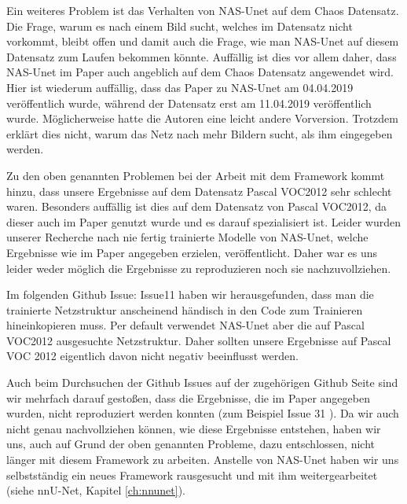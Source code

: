 Ein weiteres Problem ist das Verhalten von NAS-Unet auf dem Chaos Datensatz. Die Frage, warum es nach einem Bild sucht, welches im Datensatz nicht vorkommt, bleibt offen und damit auch die Frage, wie man NAS-Unet auf diesem Datensatz zum Laufen bekommen könnte. Auffällig ist dies vor allem daher, dass NAS-Unet im Paper auch angeblich auf dem Chaos Datensatz angewendet wird. Hier ist wiederum auffällig, dass das Paper zu NAS-Unet am 04.04.2019 veröffentlich wurde, während der Datensatz erst am 11.04.2019 veröffentlich wurde. Möglicherweise hatte die Autoren eine leicht andere Vorversion. Trotzdem erklärt dies nicht, warum das Netz nach mehr Bildern sucht, als ihm eingegeben werden.

Zu den oben genannten Problemen bei der Arbeit mit dem Framework kommt hinzu, dass unsere Ergebnisse auf dem Datensatz Pascal VOC2012 sehr schlecht waren. Besonders auffällig ist dies auf dem Datensatz von Pascal VOC2012, da dieser auch im Paper genutzt wurde und es darauf spezialisiert ist. Leider wurden unserer Recherche nach nie fertig trainierte Modelle von NAS-Unet, welche Ergebnisse wie im Paper angegeben erzielen, veröffentlicht. Daher war es uns leider weder möglich die Ergebnisse zu reproduzieren noch sie nachzuvollziehen.

Im folgenden Github Issue: Issue11 \cite{nasunetGithubIssue11} haben wir herausgefunden, dass man die trainierte Netzstruktur anscheinend händisch in den Code zum Trainieren hineinkopieren muss. Per default verwendet NAS-Unet aber die auf Pascal VOC2012 ausgesuchte Netzstruktur. Daher sollten unsere Ergebnisse auf Pascal VOC 2012 eigentlich davon nicht negativ beeinflusst werden.

Auch beim Durchsuchen der Github Issues auf der zugehörigen Github Seite \cite{nasunetGithub}  sind wir mehrfach darauf gestoßen, dass die Ergebnisse, die im Paper angegeben wurden, nicht reproduziert werden konnten (zum Beispiel Issue 31 \cite{nasunetGithubIssue31}). Da wir auch nicht genau nachvollziehen können, wie diese Ergebnisse entstehen, haben wir uns, auch auf Grund der oben genannten Probleme, dazu entschlossen, nicht länger mit diesem Framework zu arbeiten. Anstelle von NAS-Unet haben wir uns selbstständig ein neues Framework rausgesucht und mit ihm weitergearbeitet (siehe nnU-Net, Kapitel \ref{ch:nnunet}). 



